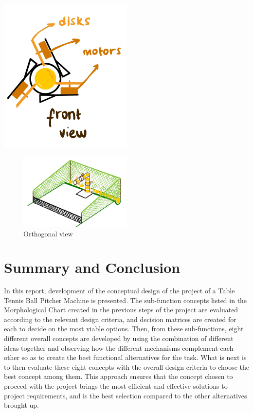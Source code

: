 \documentclass[12pt]{report}
\begin{document}
\begin{minipage}[t]{0.25\textwidth}
    \includegraphics[width=0.5\textwidth]{best_concept/front.jpeg}
\end{minipage}


\begin{figure}[H]
    \centering
    \includegraphics[width=0.5\textwidth]{best_concept/whole.jpeg}
    \caption{Orthogonal view}
    \label{fig:whole_best}
\end{figure}


\section{Summary and Conclusion}

In this report, development of the conceptual design of the project of a Table Tennis Ball Pitcher Machine is presented. The sub-function concepts listed in the Morphological Chart created in the previous steps of the project are evaluated according to the relevant design criteria, and decision matrices are created for each to decide on the most viable options. Then, from these sub-functions, eight different overall concepts are developed by using the combination of different ideas together and observing how the different mechanisms complement each other so as to create the best functional alternatives for the task. What is next is to then evaluate these eight concepts with the overall design criteria to choose the best concept among them. This approach ensures that the concept chosen to proceed with the project brings the most efficient and effective solutions to project requirements, and is the best selection compared to the other alternatives brought up.
\end{document}
